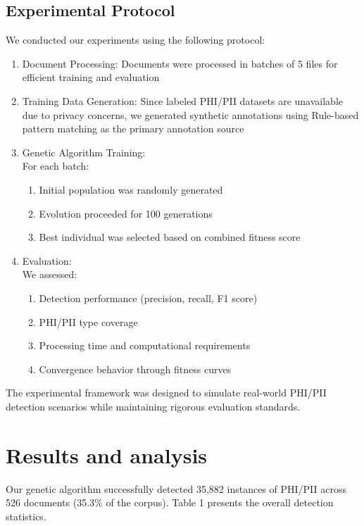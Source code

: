 \documentclass[conference]{IEEEtran}
\begin{document}
\subsection{\textbf{Experimental Protocol}}
We conducted our experiments using the following protocol:
\begin{enumerate}
\item Document Processing: Documents were processed in batches of 5 files for efficient training and evaluation
\item Training Data Generation: Since labeled PHI/PII datasets are unavailable due to privacy concerns, we generated synthetic annotations using Rule-based pattern matching as the primary annotation source
\item Genetic Algorithm Training: \\
For each batch:
\begin{enumerate}
\item Initial population was randomly generated
\item Evolution proceeded for 100 generations
\item Best individual was selected based on combined fitness score
\end{enumerate}
\item Evaluation: \\
We assessed:
\begin{enumerate}
\item Detection performance (precision, recall, F1 score)
\item PHI/PII type coverage
\item Processing time and computational requirements
\item Convergence behavior through fitness curves
\end{enumerate}
\end{enumerate}

The experimental framework was designed to simulate real-world PHI/PII detection scenarios while maintaining rigorous evaluation standards.

\section{\textbf{Results and analysis}}
Our genetic algorithm successfully detected 35,882 instances of PHI/PII across 526 documents (35.3\% of the corpus). Table 1 presents the overall detection statistics.
\end{document}
